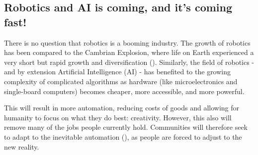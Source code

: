 \subsection{Robotics and AI is coming, and it's coming fast!}
There is no question that robotics is a booming industry.  The growth of robotics has been compared to the Cambrian Explosion, where life on Earth experienced a very short but rapid growth and diversification (\cite{Cambrian}). Similarly, the field of robotics - and by extension Artificial Intelligence (AI) - has benefited to the growing complexity of complicated algorithms as hardware (like microelectronics and single-board computers) becomes cheaper, more accessible, and more powerful. %

This will result in more automation, reducing costs of goods and allowing for humanity to focus on what they do best: creativity. However, this also will remove many of the jobs people currently hold. Communities will therefore seek to adapt to the inevitable automation (\cite{UnionsAutomation}), as people are forced to adjust to the new reality.